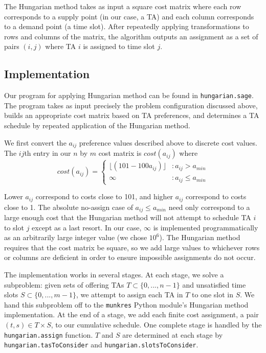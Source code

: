 \documentclass{article}
\begin{document}
\begin{multicols}{2}
The Hungarian method takes as input a square cost matrix where each row corresponds to a supply point (in our case, a TA) and each column corresponds to a demand point (a time slot). After repeatedly applying transformations to rows and columns of the matrix, the algorithm outputs an assignment as a set of pairs $(i, j)$ where TA $i$ is assigned to time slot $j$.

\subsection*{Implementation}

Our program for applying Hungarian method can be found in \texttt{hungarian.sage}. The program takes as input precisely the problem configuration discussed above, builds an appropriate cost matrix based on TA preferences, and determines a TA schedule by repeated application of the Hungarian method.

We first convert the $a_{ij}$ preference values described above to discrete cost values. The $ij$th entry in our $n$ by $m$ cost matrix is $cost(a_{ij})$ where
\begin{equation}
cost(a_{ij}) = \left\{
   \begin{array}{lr}
      \lfloor(101 - 100a_{ij})\rfloor & : a_{ij} > a_{min} \\
      \infty & : a_{ij} \leq a_{min}
   \end{array}
   \right.
\end{equation}

Lower $a_{ij}$ correspond to costs close to 101, and higher $a_{ij}$ correspond to costs close to 1. The absolute no-assign case of $a_{ij} \leq a_{min}$ need only correspond to a large enough cost that the Hungarian method will not attempt to schedule TA $i$ to slot $j$ except as a last resort. In our case, $\infty$ is implemented programmatically as an arbitrarily large integer value (we chose $10^6$). The Hungarian method requires that the cost matrix be square, so we add large values to whichever rows or columns are deficient in order to ensure impossible assignments do not occur.

The implementation works in several stages. At each stage, we solve a subproblem: given sets of offering TAs $T \subset \{0, ..., n - 1\}$ and unsatisfied time slots $S \subset \{0, ..., m - 1\}$, we attempt to assign each TA in $T$ to one slot in $S$. We hand this subproblem off to the \texttt{munkres} Python module's Hungarian method implementation. At the end of a stage, we add each finite cost assignment, a pair $(t, s) \in T \times S$, to our cumulative schedule. One complete stage is handled by the \texttt{hungarian.assign} function. $T$ and $S$ are determined at each stage by \texttt{hungarian.tasToConsider} and \texttt{hungarian.slotsToConsider}.


\end{multicols}
\end{document}
